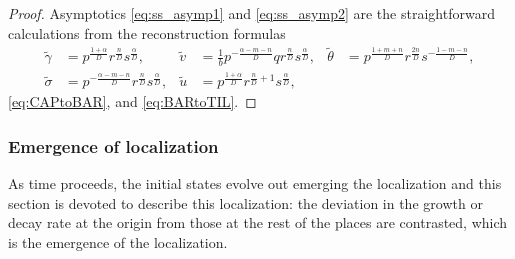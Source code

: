 \documentclass[a4paper,11pt]{article}
\def\tg{{\tilde{\gamma}}}
\def\tv{{\tilde{v}}}
\def\tth{{\tilde{\theta}}}
\def\ts{{\tilde{\sigma}}}
\def\tu{{\tilde{u}}}
\begin{document}
\begin{proof}
Asymptotics \eqref{eq:ss_asymp1} and \eqref{eq:ss_asymp2} are the straightforward calculations from the reconstruction formulas 
\begin{align*}
 \tg&=p^{\frac{1+\alpha}{D}}r^{\frac{n}{D}}s^{\frac{\alpha}{D}}, & \tv &= \frac{1}{b} p^{-\frac{\alpha-m-n}{D}}qr^{\frac{n}{D}}s^{\frac{\alpha}{D}}, & \tth&=p^{\frac{1+m+n}{D}}r^{\frac{2n}{D}}s^{-\frac{1-m-n}{D}}, \\ \ts&=p^{-\frac{\alpha-m-n}{D}}r^{\frac{n}{D}}s^{\frac{\alpha}{D}},  & \tu&=p^{\frac{1+\alpha}{D}}r^{\frac{n}{D}+1}s^{\frac{\alpha}{D}},
\end{align*}
\eqref{eq:CAPtoBAR}, and \eqref{eq:BARtoTIL}.
% 
% 
% 
\end{proof}

\subsubsection{Emergence of localization}
As time proceeds, the initial states evolve out emerging the localization and this section is devoted to describe this localization: the deviation in the growth or decay rate at the origin from those at the rest of the places are contrasted, which is the emergence of the localization. 
\end{document}
